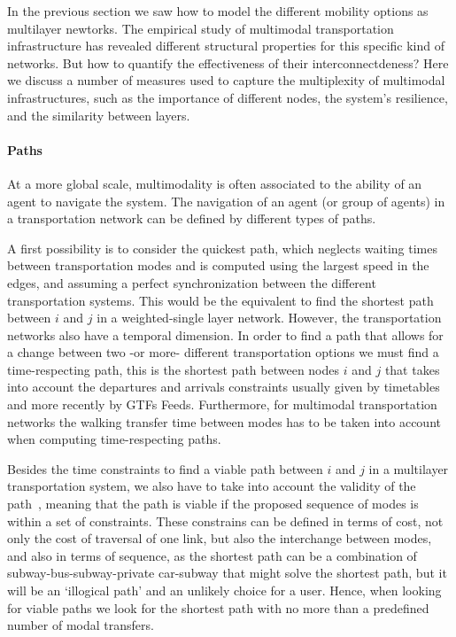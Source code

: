 In the previous section we saw how to model the different mobility options as multilayer newtorks. The empirical study of multimodal transportation infrastructure has revealed different structural properties for this specific kind of networks. But how to quantify the effectiveness of their interconnectdeness? Here we discuss a number of measures used to capture the multiplexity of multimodal infrastructures, such as the importance of different nodes, the system's resilience, and the similarity between layers.

\paragraph*{Paths} 
At a more global scale, multimodality is often associated to the ability of an agent to navigate the system. The navigation of an agent (or group of agents) in a transportation network can be defined by different types of paths.

A first possibility is to consider the quickest path, which neglects waiting times between transportation modes and is computed using the largest speed in the edges, and assuming a perfect synchronization between the different transportation systems. This would be the equivalent to find the shortest path between $i$ and $j$ in a weighted-single layer network. However, the transportation networks also have a temporal dimension. In order to find a path that allows for a change between two -or more- different transportation options we must find a time-respecting path, this is the shortest path between nodes $i$ and $j$ that takes into account the departures and arrivals constraints usually given by timetables and more recently by GTFs Feeds. Furthermore, for multimodal transportation networks the walking transfer time between modes has to be taken into account when computing time-respecting paths.

Besides the time constraints to find a viable path between $i$ and $j$ in a multilayer transportation system, we also have to take into account the validity of the path~\cite{battista1996path, lozano2001path}, meaning that the path is viable if the proposed sequence of modes is within a set of constraints. These constrains can be defined in terms of cost, not only the cost of traversal of one link, but also the interchange between modes, and also in terms of sequence, as the shortest path can be a combination of subway-bus-subway-private car-subway that might solve the shortest path, but it will be an `illogical path' and an unlikely choice for a user. Hence, when looking for viable paths we look for the shortest path with no more than a predefined number of modal transfers.

